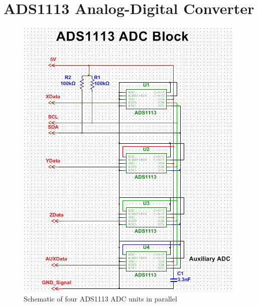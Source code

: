 \section{ADS1113 Analog-Digital Converter}
\begin{figure}[H]
\centering
\includegraphics[width=\textwidth,height=\textheight,keepaspectratio]{./KIRBY_Images/Multisim_4ADC}
\caption{Schematic of four ADS1113 ADC units in parallel}
\label{fig:Schematic_ADS1113}
\end{figure}

